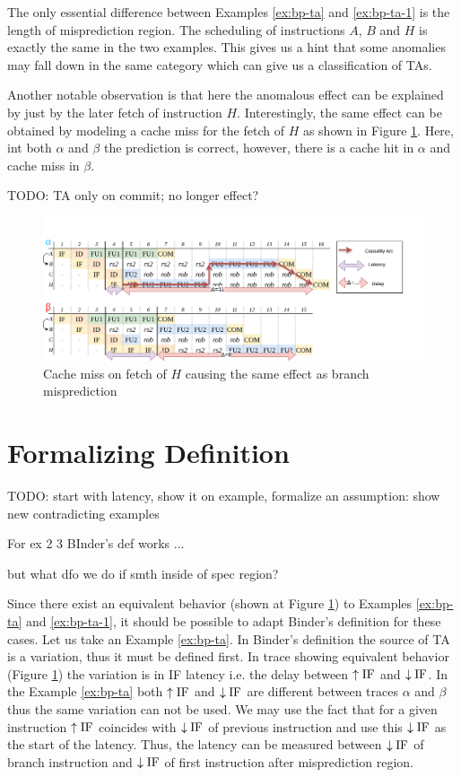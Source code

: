 The only essential difference between Examples \ref{ex:bp-ta} and \ref{ex:bp-ta-1} is the length of misprediction region. The scheduling of instructions $A$, $B$ and $H$ is exactly the same in the two examples. This gives us a hint that some anomalies may fall down in the same category which can give us a classification of TAs.

Another notable observation is that here the anomalous effect can be explained by just by the later fetch of instruction $H$. Interestingly, the same effect can be obtained by modeling a cache miss for the fetch of $H$ as shown in Figure \ref{fig:equiv-to-bp-ta}. Here, int both $\alpha$ and $\beta$ the prediction is correct, however, there is a cache hit in $\alpha$ and cache miss in $\beta$.

TODO: TA only on commit; no longer effect?

\begin{figure}[H]
    \centering
    \includegraphics[width=\textwidth]{figures/equiv-trace.png}
    \caption{Cache miss on fetch of $H$ causing the same effect as branch misprediction}
    \label{fig:equiv-to-bp-ta}
\end{figure}

\section{Formalizing Definition}

TODO: start with latency, show it on example, formalize an assumption: show new contradicting examples

For ex 2 3 BInder's def works ...

but what dfo we do if smth inside of spec region?


Since there exist an equivalent behavior (shown at Figure \ref{fig:equiv-to-bp-ta}) to Examples \ref{ex:bp-ta}  and \ref{ex:bp-ta-1}, it should be possible to adapt Binder's definition for these cases. Let us take an Example \ref{ex:bp-ta}. In Binder's definition the source of TA is a variation, thus it must be defined first. In trace showing equivalent behavior (Figure \ref{fig:equiv-to-bp-ta}) the variation is in IF latency i.e. the delay between $\uparrow\mathrm{IF}$ and $\downarrow\mathrm{IF}$. In the Example \ref{ex:bp-ta} both $\uparrow\mathrm{IF}$ and $\downarrow\mathrm{IF}$ are different between traces $\alpha$ and $\beta$ thus the same variation can not be used. We may use the fact that for a given instruction $\uparrow\mathrm{IF}$ coincides with $\downarrow\mathrm{IF}$ of previous instruction and use this $\downarrow\mathrm{IF}$ as the start of the latency. Thus, the latency can be measured between $\downarrow\mathrm{IF}$ of branch instruction and $\downarrow\mathrm{IF}$ of first instruction after misprediction region.

